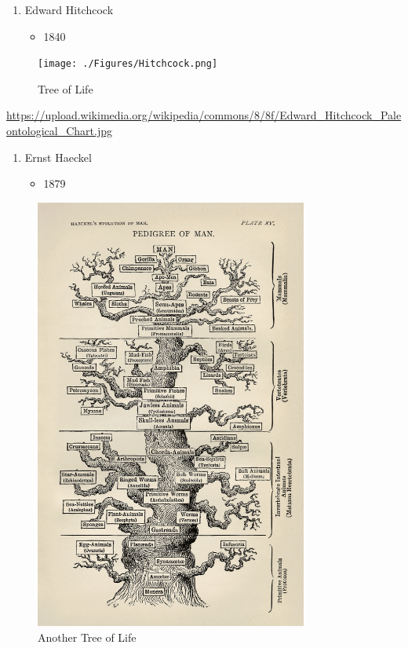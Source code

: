 \documentclass[
]{book}
\providecommand{\tightlist}{%
  \setlength{\itemsep}{0pt}\setlength{\parskip}{0pt}}
\begin{document}
\begin{enumerate}
\def\labelenumi{\arabic{enumi}.}
\setcounter{enumi}{1}
\tightlist
\item
  Edward Hitchcock

  \begin{itemize}
  \tightlist
  \item
    1840
  \end{itemize}
\end{enumerate}

\begin{figure}
\centering
\texttt{[image: ./Figures/Hitchcock.png]}
\caption{Tree of Life}
\end{figure}

\url{https://upload.wikimedia.org/wikipedia/commons/8/8f/Edward_Hitchcock_Paleontological_Chart.jpg}

\begin{enumerate}
\def\labelenumi{\arabic{enumi}.}
\setcounter{enumi}{2}
\tightlist
\item
  Ernst Haeckel

  \begin{itemize}
  \tightlist
  \item
    1879
  \end{itemize}
\end{enumerate}

\begin{figure}
\centering
\includegraphics[width=0.8\textwidth,height=\textheight]{./Figures/Haeckel.png}
\caption{Another Tree of Life}
\end{figure}
\end{document}
